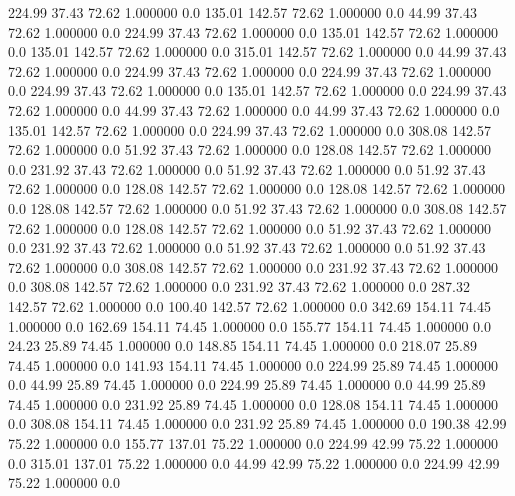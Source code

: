   224.99   37.43   72.62    1.000000    0.0
  135.01  142.57   72.62    1.000000    0.0
   44.99   37.43   72.62    1.000000    0.0
  224.99   37.43   72.62    1.000000    0.0
  135.01  142.57   72.62    1.000000    0.0
  135.01  142.57   72.62    1.000000    0.0
  315.01  142.57   72.62    1.000000    0.0
   44.99   37.43   72.62    1.000000    0.0
  224.99   37.43   72.62    1.000000    0.0
  224.99   37.43   72.62    1.000000    0.0
  224.99   37.43   72.62    1.000000    0.0
  135.01  142.57   72.62    1.000000    0.0
  224.99   37.43   72.62    1.000000    0.0
   44.99   37.43   72.62    1.000000    0.0
   44.99   37.43   72.62    1.000000    0.0
  135.01  142.57   72.62    1.000000    0.0
  224.99   37.43   72.62    1.000000    0.0
  308.08  142.57   72.62    1.000000    0.0
   51.92   37.43   72.62    1.000000    0.0
  128.08  142.57   72.62    1.000000    0.0
  231.92   37.43   72.62    1.000000    0.0
   51.92   37.43   72.62    1.000000    0.0
   51.92   37.43   72.62    1.000000    0.0
  128.08  142.57   72.62    1.000000    0.0
  128.08  142.57   72.62    1.000000    0.0
  128.08  142.57   72.62    1.000000    0.0
   51.92   37.43   72.62    1.000000    0.0
  308.08  142.57   72.62    1.000000    0.0
  128.08  142.57   72.62    1.000000    0.0
   51.92   37.43   72.62    1.000000    0.0
  231.92   37.43   72.62    1.000000    0.0
   51.92   37.43   72.62    1.000000    0.0
   51.92   37.43   72.62    1.000000    0.0
  308.08  142.57   72.62    1.000000    0.0
  231.92   37.43   72.62    1.000000    0.0
  308.08  142.57   72.62    1.000000    0.0
  231.92   37.43   72.62    1.000000    0.0
  287.32  142.57   72.62    1.000000    0.0
  100.40  142.57   72.62    1.000000    0.0
  342.69  154.11   74.45    1.000000    0.0
  162.69  154.11   74.45    1.000000    0.0
  155.77  154.11   74.45    1.000000    0.0
   24.23   25.89   74.45    1.000000    0.0
  148.85  154.11   74.45    1.000000    0.0
  218.07   25.89   74.45    1.000000    0.0
  141.93  154.11   74.45    1.000000    0.0
  224.99   25.89   74.45    1.000000    0.0
   44.99   25.89   74.45    1.000000    0.0
  224.99   25.89   74.45    1.000000    0.0
   44.99   25.89   74.45    1.000000    0.0
  231.92   25.89   74.45    1.000000    0.0
  128.08  154.11   74.45    1.000000    0.0
  308.08  154.11   74.45    1.000000    0.0
  231.92   25.89   74.45    1.000000    0.0
  190.38   42.99   75.22    1.000000    0.0
  155.77  137.01   75.22    1.000000    0.0
  224.99   42.99   75.22    1.000000    0.0
  315.01  137.01   75.22    1.000000    0.0
   44.99   42.99   75.22    1.000000    0.0
  224.99   42.99   75.22    1.000000    0.0
